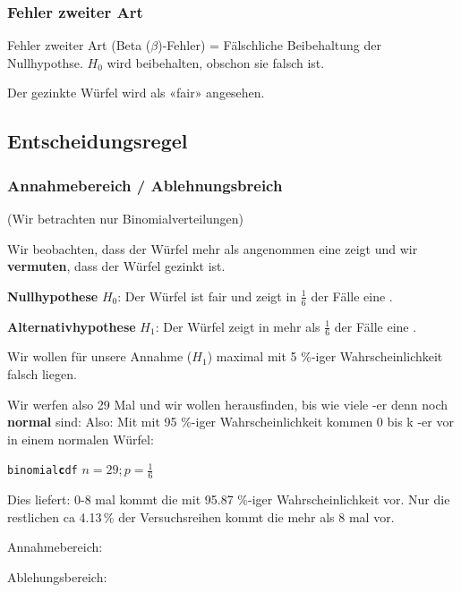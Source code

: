 \subsubsection{Fehler zweiter Art}
Fehler zweiter Art (Beta ($\beta$)-Fehler) = Fälschliche Beibehaltung
der Nullhypothse. $H_0$ wird beibehalten, obschon sie falsch ist. 

Der gezinkte Würfel wird als «fair» angesehen.

\TNTeop{}
\newpage


\subsection{Entscheidungsregel}
\subsubsection*{Annahmebereich / Ablehnungsbreich}
(Wir betrachten nur Binomialverteilungen)

Wir beobachten, dass der Würfel mehr als angenommen eine 
zeigt und wir \textbf{vermuten}, dass der Würfel gezinkt ist.

\textbf{Nullhypothese} $H_0$: Der Würfel ist fair und zeigt in
$\frac16$ der Fälle eine .

\textbf{Alternativhypothese} $H_1$: Der Würfel zeigt in mehr als
$\frac{1}{6}$ der Fälle eine .

Wir wollen für unsere Annahme ($H_1$) maximal mit 5 \%-iger
Wahrscheinlichkeit falsch liegen.

Wir werfen also 29 Mal und wir wollen herausfinden, bis wie viele
-er denn noch \textbf{normal} sind:
Also: Mit mit 95 \%-iger Wahrscheinlichkeit kommen 0 bis k
-er vor in einem normalen Würfel:

\texttt{binomial\textbf{c}df} $n=29; p=\frac16$

Dies liefert: 0-8 mal kommt die  mit 95.87 \%-iger
Wahrscheinlichkeit vor. Nur die restlichen ca 4.13\,\% der
Versuchsreihen kommt die  mehr als 8 mal vor.


Annahmebereich:


Ablehungsbereich:


\newpage


